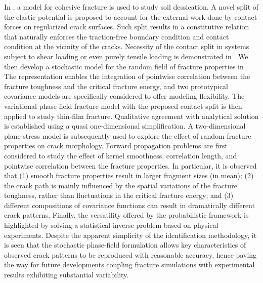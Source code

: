 In , a model for cohesive fracture is used to study soil dessication. A novel split of the elastic potential is proposed to account for the external work done by contact forces on regularized crack surfaces. Such split results in a constitutive relation that naturally enforces the traction-free boundary condition and contact condition at the vicinity of the cracks. Necessity of the contact split in systems subject to shear loading or even purely tensile loading is demonstrated in . We then develop a stochastic model for the random field of fracture properties in . The representation enables the integration of pointwise correlation between the fracture toughness and the critical fracture energy, and two prototypical covariance models are specifically considered to offer modeling flexibility.
The variational phase-field fracture model with the proposed contact split is then applied to study thin-film fracture. Qualitative agreement with analytical solution is established using a quasi one-dimensional simplification. A two-dimensional plane-stress model is subsequently used to explore the effect of random fracture properties on crack morphology. Forward propagation problems are first considered to study the effect of kernel smoothness, correlation length, and pointwise correlation between the fracture properties. In particular, it is observed that (1) smooth fracture properties result in larger fragment sizes (in mean); (2) the crack path is mainly influenced by the spatial variations of the fracture toughness, rather than fluctuations in the critical fracture energy; and (3) different compositions of covariance functions can result in dramatically different crack patterns. Finally, the versatility offered by the probabilistic framework is highlighted by solving a statistical inverse problem based on physical experiments. Despite the apparent simplicity of the identification methodology, it is seen that the stochastic phase-field formulation allows key characteristics of observed crack patterns to be reproduced with reasonable accuracy, hence paving the way for future developments coupling fracture simulations with experimental results exhibiting substantial variability.

